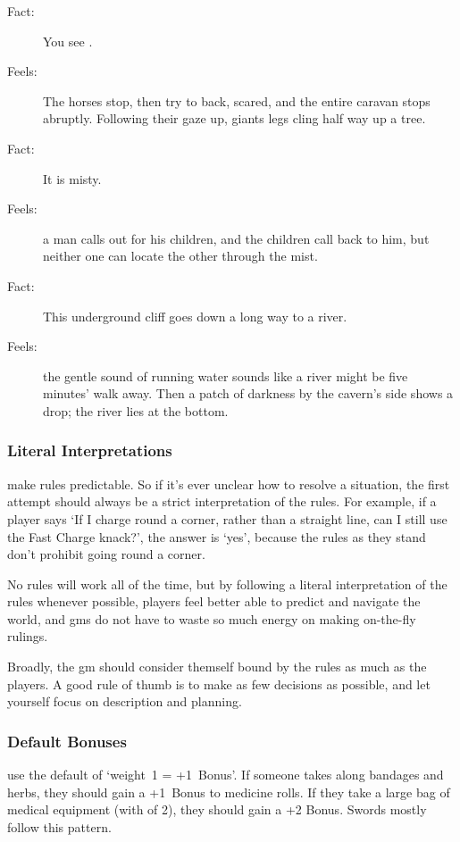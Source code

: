 \begin{multicols}{2}
\begin{description}
  \item[Fact:] You see .
  \item[\quad Feels:] The horses stop, then try to back, scared, and the entire caravan stops abruptly.
  Following their gaze up, giants legs cling half way up a tree.
  \item[Fact:] It is misty.
  \item[\quad Feels:] a man calls out for his children, and the children call back to him, but neither one can locate the other through the mist.
  \item[Fact:] This underground cliff goes down a long way to a river.
  \item[\quad Feels:] the gentle sound of running water sounds like a river might be five minutes' walk away.
  Then a patch of darkness by the cavern's side shows a drop; the river lies at the bottom.
\end{description}

\subsubsection{Literal Interpretations}
make rules predictable.
So if it's ever unclear how to resolve a situation, the first attempt should always be a strict interpretation of the rules.
For example, if a player says `If I charge round a corner, rather than a straight line, can I still use the Fast Charge knack?', the answer is `yes', because the rules as they stand don't prohibit going round a corner.

No rules will work all of the time, but by following a literal interpretation of the rules whenever possible, players feel better able to predict and navigate the world, and \glspl{gm} do not have to waste so much energy on making on-the-fly rulings.

Broadly, the \gls{gm} should consider themself bound by the rules as much as the players.
A good rule of thumb is to make as few decisions as possible, and let yourself focus on description and planning.

\subsubsection{Default Bonuses}
use the default of `\gls{weight}~1 = +1~Bonus'.
If someone takes along bandages and herbs, they should gain a +1~Bonus to medicine rolls.
If they take a large bag of medical equipment (with  of 2), they should gain a +2 Bonus.
Swords mostly follow this pattern.


\end{multicols}

